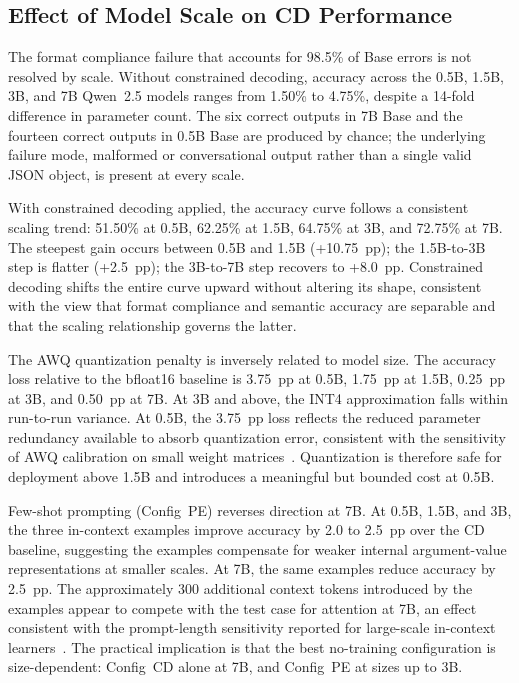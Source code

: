 \subsection{Effect of Model Scale on CD Performance}

The format compliance failure that accounts for 98.5\% of Base errors
is not resolved by scale.
Without constrained decoding, accuracy across the 0.5B, 1.5B, 3B,
and 7B Qwen~2.5 models ranges from 1.50\% to 4.75\%, despite a
14-fold difference in parameter count.
The six correct outputs in 7B Base and the fourteen correct outputs
in 0.5B Base are produced by chance; the underlying failure mode,
malformed or conversational output rather than a single valid JSON
object, is present at every scale.

With constrained decoding applied, the accuracy curve follows a
consistent scaling trend: 51.50\% at 0.5B, 62.25\% at 1.5B, 64.75\%
at 3B, and 72.75\% at 7B.
The steepest gain occurs between 0.5B and 1.5B (+10.75~pp); the
1.5B-to-3B step is flatter (+2.5~pp); the 3B-to-7B step recovers
to +8.0~pp.
Constrained decoding shifts the entire curve upward without altering
its shape, consistent with the view that format compliance and
semantic accuracy are separable and that the scaling relationship
governs the latter.

The AWQ quantization penalty is inversely related to model size.
The accuracy loss relative to the bfloat16 baseline is 3.75~pp at 0.5B,
1.75~pp at 1.5B, 0.25~pp at 3B, and 0.50~pp at 7B.
At 3B and above, the INT4 approximation falls within run-to-run
variance.
At 0.5B, the 3.75~pp loss reflects the reduced parameter redundancy
available to absorb quantization error, consistent with the
sensitivity of AWQ calibration on small weight
matrices~\cite{lin2024awq}.
Quantization is therefore safe for deployment above 1.5B and
introduces a meaningful but bounded cost at 0.5B.

Few-shot prompting (Config~PE) reverses direction at 7B.
At 0.5B, 1.5B, and 3B, the three in-context examples improve
accuracy by 2.0 to 2.5~pp over the CD baseline, suggesting the
examples compensate for weaker internal argument-value
representations at smaller scales.
At 7B, the same examples reduce accuracy by 2.5~pp.
The approximately 300 additional context tokens introduced by the
examples appear to compete with the test case for attention at 7B,
an effect consistent with the prompt-length sensitivity reported
for large-scale in-context learners~\cite{brown2020language}.
The practical implication is that the best no-training configuration
is size-dependent: Config~CD alone at 7B, and Config~PE at
sizes up to 3B.

